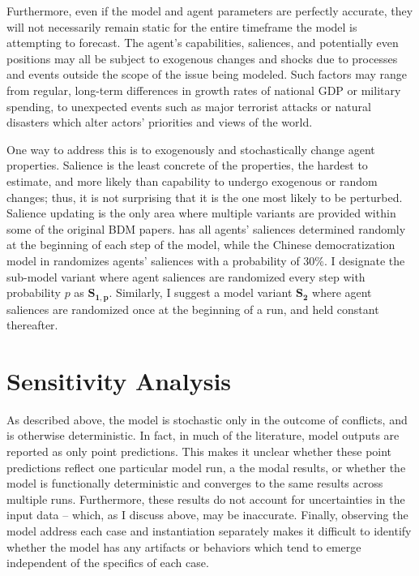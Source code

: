 Furthermore, even if the model and agent parameters are perfectly accurate, they will not necessarily remain static for the entire timeframe the model is attempting to forecast. The agent's capabilities, saliences, and potentially even positions may all be subject to exogenous changes and shocks due to processes and events outside the scope of the issue being modeled. Such factors may range from regular, long-term differences in growth rates of national GDP or military spending, to unexpected events such as major terrorist attacks or natural disasters which alter actors' priorities and views of the world.

One way to address this is to exogenously and stochastically change agent properties. Salience is the least concrete of the properties, the hardest to estimate, and more likely than capability to undergo exogenous or random changes; thus, it is not surprising that it is the one most likely to be perturbed. Salience updating is the only area where multiple variants are provided within some of the original BDM papers. \citet{bdm_1998} has all agents' saliences determined randomly at the beginning of each step of the model, while the Chinese democratization model in \citet[chapter 6]{bdm_2002} randomizes agents' saliences with a probability of 30\%. I designate the sub-model variant where agent saliences are randomized every step with probability $p$ as $\mathbf{S_{1,p}}$. Similarly, I suggest a model variant $\mathbf{S_2}$ where agent saliences are randomized once at the beginning of a run, and held constant thereafter.

\section{Sensitivity Analysis} \label{sensitivity-analysis}

As described above, the model is stochastic only in the outcome of conflicts, and is otherwise deterministic. In fact, in much of the literature, model outputs are reported as only point predictions. This makes it unclear whether these point predictions reflect one particular model run, a the modal results, or whether the model is functionally deterministic and converges to the same results across multiple runs. Furthermore, these results do not account for uncertainties in the input data -- which, as I discuss above, may be inaccurate. Finally, observing the model address each case and instantiation separately makes it difficult to identify whether the model has any artifacts or behaviors which tend to emerge independent of the specifics of each case.

